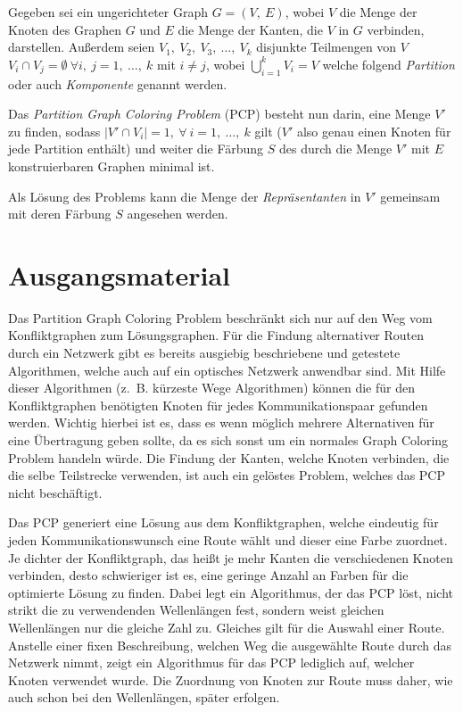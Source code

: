 Gegeben sei ein ungerichteter Graph $G = (V,\ E)$, wobei $V$ die Menge der Knoten des Graphen $G$ und $E$ die Menge der Kanten, die $V$ in $G$ verbinden, darstellen. Außerdem seien $V_1,\ V_2,\ V_3,\ \ldots,\ V_k$ disjunkte Teilmengen von $V$ $V_i \cap V_j = \emptyset \ \forall i,\ j = 1,\ \ldots,\ k$ mit $i \not = j$, wobei $\bigcup_{i = 1}^k V_i = V$ welche folgend \textit{Partition} oder auch \textit{Komponente} genannt werden.

Das \textit{Partition Graph Coloring Problem} (PCP) besteht nun darin, eine Menge $V'$ zu finden, sodass $|V' \cap V_i| = 1,\ \forall\ i = 1,\ \ldots,\ k$ gilt ($V'$ also genau einen Knoten für jede Partition enthält) und weiter die Färbung $S$ des durch die Menge $V'$ mit $E$ konstruierbaren Graphen minimal ist.

Als Lösung des Problems kann die Menge der \textit{Repräsentanten} in $V'$ gemeinsam mit deren Färbung $S$ angesehen werden.

\section{Ausgangsmaterial}
Das Partition Graph Coloring Problem beschränkt sich nur auf den Weg vom Konfliktgraphen zum Lösungsgraphen. Für die Findung alternativer Routen durch ein Netzwerk gibt es 
bereits ausgiebig beschriebene und getestete Algorithmen, welche auch auf ein optisches Netzwerk anwendbar sind. Mit Hilfe dieser Algorithmen (z.\ B. kürzeste Wege Algorithmen) können die für den
Konfliktgraphen benötigten Knoten für jedes Kommunikationspaar gefunden werden. Wichtig hierbei ist es, dass es wenn möglich mehrere Alternativen für eine Übertragung geben sollte,
da es sich sonst um ein normales Graph Coloring Problem handeln würde. Die Findung der Kanten, welche Knoten verbinden, die die selbe Teilstrecke verwenden, ist auch ein
gelöstes Problem, welches das PCP nicht beschäftigt.

Das PCP generiert eine Lösung aus dem Konfliktgraphen, welche eindeutig für jeden Kommunikationswunsch eine Route wählt und dieser eine Farbe zuordnet. Je dichter der Konfliktgraph, das heißt
je mehr Kanten die verschiedenen Knoten verbinden, desto schwieriger ist es, eine geringe Anzahl an Farben für die optimierte Lösung zu finden. Dabei legt ein Algorithmus, der das
PCP löst, nicht strikt die zu verwendenden Wellenlängen fest, sondern weist gleichen Wellenlängen nur die gleiche Zahl zu. Gleiches gilt für die Auswahl einer Route. Anstelle
einer fixen Beschreibung, welchen Weg die ausgewählte Route durch das Netzwerk nimmt, zeigt ein Algorithmus für das PCP lediglich auf, welcher Knoten verwendet wurde. 
Die Zuordnung von Knoten zur Route muss daher, wie auch schon bei den Wellenlängen, später erfolgen.

